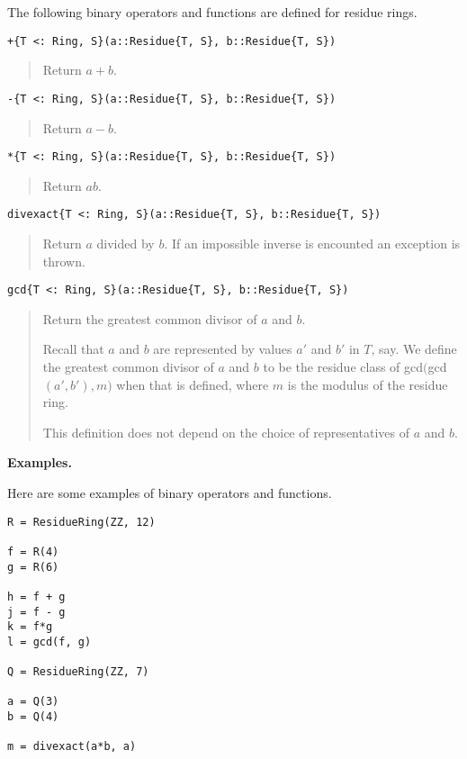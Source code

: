 \documentclass[a4paper,10pt]{article}
\newcommand{\desc}[1]{\vspace{-3mm}\begin{quote}#1\end{quote}}
\begin{document}
{{The following binary operators and functions are defined for residue rings.

\begin{lstlisting}
+{T <: Ring, S}(a::Residue{T, S}, b::Residue{T, S})
\end{lstlisting}

\desc{Return $a + b$.}

\begin{lstlisting}
-{T <: Ring, S}(a::Residue{T, S}, b::Residue{T, S})
\end{lstlisting}

\desc{Return $a - b$.}

\begin{lstlisting}
*{T <: Ring, S}(a::Residue{T, S}, b::Residue{T, S})
\end{lstlisting}

\desc{Return $ab$.}

\begin{lstlisting}
divexact{T <: Ring, S}(a::Residue{T, S}, b::Residue{T, S})
\end{lstlisting}

\desc{Return $a$ divided by $b$. If an impossible inverse is encounted
an exception is thrown.}

\begin{lstlisting}
gcd{T <: Ring, S}(a::Residue{T, S}, b::Residue{T, S})
\end{lstlisting}

\desc{Return the greatest common divisor of $a$ and $b$. 

Recall that $a$ and $b$ are represented by values $a'$ and $b'$ in $T$, 
say. We define the greatest common divisor of $a$ and $b$ to be the 
residue class of gcd$($gcd$(a', b'), m)$ when that is defined, where 
$m$ is the modulus of the residue ring.

This definition does not depend on the choice of representatives of
$a$ and $b$.}

\textbf{Examples.}

Here are some examples of binary operators and functions.

\begin{lstlisting}
R = ResidueRing(ZZ, 12)

f = R(4)
g = R(6)

h = f + g
j = f - g
k = f*g
l = gcd(f, g)

Q = ResidueRing(ZZ, 7)

a = Q(3)
b = Q(4)

m = divexact(a*b, a)


\end{lstlisting}}}
\end{document}
